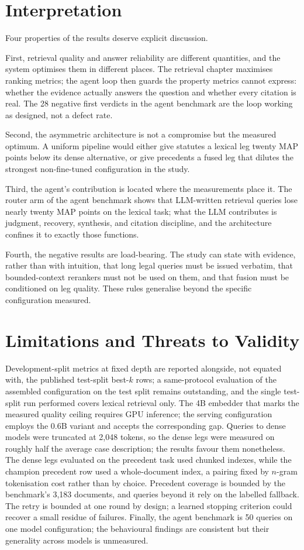 \documentclass{mnnit}
\begin{document}
\section{Interpretation}
Four properties of the results deserve explicit discussion.

First, retrieval quality and answer reliability are different
quantities, and the system optimises them in different places.
The retrieval chapter maximises ranking metrics; the agent loop
then guards the property metrics cannot express: whether the
evidence actually answers the question and whether every citation
is real. The 28 negative first verdicts in the agent benchmark
are the loop working as designed, not a defect rate.

Second, the asymmetric architecture is not a compromise but the
measured optimum. A uniform pipeline would either give statutes a
lexical leg twenty MAP points below its dense alternative, or
give precedents a fused leg that dilutes the strongest
non-fine-tuned configuration in the study.

Third, the agent's contribution is located where the measurements
place it. The router arm of the agent benchmark shows that
LLM-written retrieval queries lose nearly twenty MAP points on
the lexical task; what the LLM contributes is judgment,
recovery, synthesis, and citation discipline, and the
architecture confines it to exactly those functions.

Fourth, the negative results are load-bearing. The study can
state with evidence, rather than with intuition, that long legal
queries must be issued verbatim, that bounded-context rerankers
must not be used on them, and that fusion must be conditioned on
leg quality. These rules generalise beyond the specific
configuration measured.

\section{Limitations and Threats to Validity}
Development-split metrics at fixed depth are reported alongside,
not equated with, the published test-split best-$k$ rows; a
same-protocol evaluation of the assembled configuration on the
test split remains outstanding, and the single test-split run
performed covers lexical retrieval only. The 4B embedder that
marks the measured quality ceiling requires GPU inference; the
serving configuration employs the 0.6B variant and accepts the
corresponding gap. Queries to dense models were truncated at
2,048 tokens, so the dense legs were measured on roughly half the
average case description; the results favour them nonetheless.
The dense legs evaluated on the precedent task used chunked
indexes, while the champion precedent row used a whole-document
index, a pairing fixed by $n$-gram tokenisation cost rather than
by choice. Precedent coverage is bounded by the benchmark's
3,183 documents, and queries beyond it rely on the labelled
fallback. The retry is bounded at one round by design; a learned
stopping criterion could recover a small residue of failures.
Finally, the agent benchmark is 50 queries on one model
configuration; the behavioural findings are consistent but their
generality across models is unmeasured.
\end{document}
